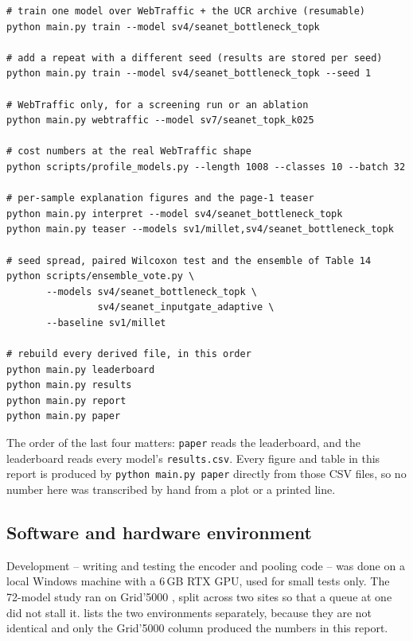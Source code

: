 {\footnotesize
\begin{verbatim}
# train one model over WebTraffic + the UCR archive (resumable)
python main.py train --model sv4/seanet_bottleneck_topk

# add a repeat with a different seed (results are stored per seed)
python main.py train --model sv4/seanet_bottleneck_topk --seed 1

# WebTraffic only, for a screening run or an ablation
python main.py webtraffic --model sv7/seanet_topk_k025

# cost numbers at the real WebTraffic shape
python scripts/profile_models.py --length 1008 --classes 10 --batch 32

# per-sample explanation figures and the page-1 teaser
python main.py interpret --model sv4/seanet_bottleneck_topk
python main.py teaser --models sv1/millet,sv4/seanet_bottleneck_topk

# seed spread, paired Wilcoxon test and the ensemble of Table 14
python scripts/ensemble_vote.py \
       --models sv4/seanet_bottleneck_topk \
                sv4/seanet_inputgate_adaptive \
       --baseline sv1/millet

# rebuild every derived file, in this order
python main.py leaderboard
python main.py results
python main.py report
python main.py paper
\end{verbatim}}

The order of the last four matters: \texttt{paper} reads the leaderboard, and the leaderboard reads
every model's \texttt{results.csv}. Every figure and table in this report is produced by
\texttt{python main.py paper} directly from those CSV files, so no number here was transcribed by
hand from a plot or a printed line.

\subsection{Software and hardware environment}
\label{app:env}

Development -- writing and testing the encoder and pooling code -- was done on a local Windows
machine with a 6\,GB RTX GPU, used for small tests only. The 72-model study ran on Grid'5000
\citep{balouek2013grid5000}, split across two sites so that a queue at one did not stall it.
\Cref{tab:environment} lists the two environments separately, because they are not identical and only
the Grid'5000 column produced the numbers in this report.

